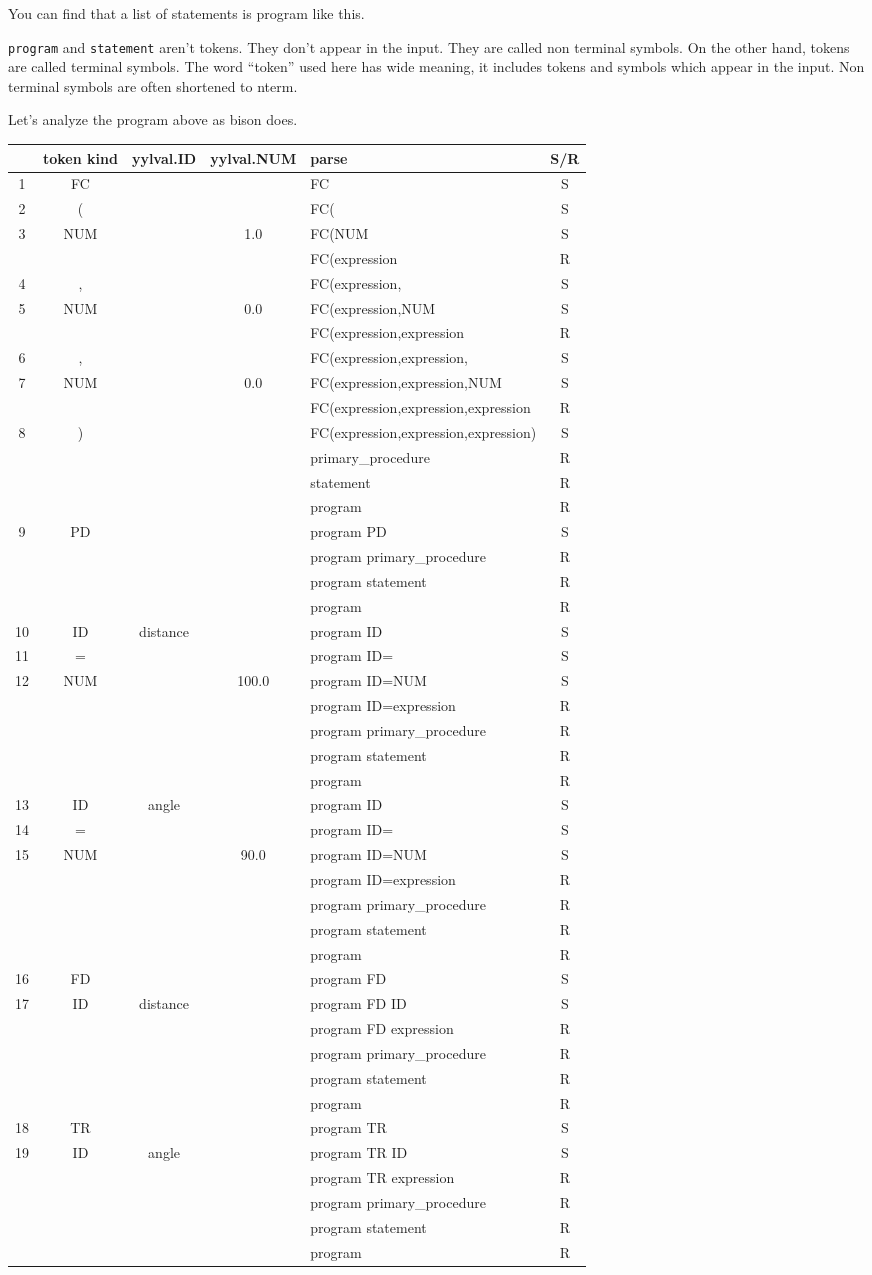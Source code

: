 You can find that a list of statements is program like this.

\passthrough{\lstinline!program!} and
\passthrough{\lstinline!statement!} aren't tokens. They don't appear in
the input. They are called non terminal symbols. On the other hand,
tokens are called terminal symbols. The word ``token'' used here has
wide meaning, it includes tokens and symbols which appear in the input.
Non terminal symbols are often shortened to nterm.

Let's analyze the program above as bison does.

\begin{longtable}[]{@{}cccclc@{}}
\toprule
& token kind & yylval.ID & yylval.NUM & parse & S/R\tabularnewline
\midrule
\endhead
1 & FC & & & FC & S\tabularnewline
2 & ( & & & FC( & S\tabularnewline
3 & NUM & & 1.0 & FC(NUM & S\tabularnewline
& & & & FC(expression & R\tabularnewline
4 & , & & & FC(expression, & S\tabularnewline
5 & NUM & & 0.0 & FC(expression,NUM & S\tabularnewline
& & & & FC(expression,expression & R\tabularnewline
6 & , & & & FC(expression,expression, & S\tabularnewline
7 & NUM & & 0.0 & FC(expression,expression,NUM & S\tabularnewline
& & & & FC(expression,expression,expression & R\tabularnewline
8 & ) & & & FC(expression,expression,expression) & S\tabularnewline
& & & & primary\_procedure & R\tabularnewline
& & & & statement & R\tabularnewline
& & & & program & R\tabularnewline
9 & PD & & & program PD & S\tabularnewline
& & & & program primary\_procedure & R\tabularnewline
& & & & program statement & R\tabularnewline
& & & & program & R\tabularnewline
10 & ID & distance & & program ID & S\tabularnewline
11 & = & & & program ID= & S\tabularnewline
12 & NUM & & 100.0 & program ID=NUM & S\tabularnewline
& & & & program ID=expression & R\tabularnewline
& & & & program primary\_procedure & R\tabularnewline
& & & & program statement & R\tabularnewline
& & & & program & R\tabularnewline
13 & ID & angle & & program ID & S\tabularnewline
14 & = & & & program ID= & S\tabularnewline
15 & NUM & & 90.0 & program ID=NUM & S\tabularnewline
& & & & program ID=expression & R\tabularnewline
& & & & program primary\_procedure & R\tabularnewline
& & & & program statement & R\tabularnewline
& & & & program & R\tabularnewline
16 & FD & & & program FD & S\tabularnewline
17 & ID & distance & & program FD ID & S\tabularnewline
& & & & program FD expression & R\tabularnewline
& & & & program primary\_procedure & R\tabularnewline
& & & & program statement & R\tabularnewline
& & & & program & R\tabularnewline
18 & TR & & & program TR & S\tabularnewline
19 & ID & angle & & program TR ID & S\tabularnewline
& & & & program TR expression & R\tabularnewline
& & & & program primary\_procedure & R\tabularnewline
& & & & program statement & R\tabularnewline
& & & & program & R\tabularnewline
\bottomrule
\end{longtable}

